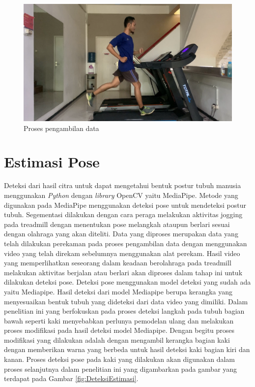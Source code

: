 \begin{figure}[H]
  \centering
  \includegraphics[scale=0.8]{gambar/pengambilan data.png}
  \caption{Proses pengambilan data}
  \label{fig:PengambilanData}
\end{figure}


\section{Estimasi Pose}
\label{sec:DeteksiPose}

Deteksi dari hasil citra untuk dapat mengetahui bentuk postur tubuh manusia menggunakan \emph{Python} dengan \emph{library} OpenCV yaitu MediaPipe. Metode yang digunakan pada MediaPipe menggunakan deteksi pose untuk mendeteksi postur tubuh. Segementasi dilakukan dengan cara peraga melakukan aktivitas jogging pada treadmill dengan menentukan pose melangkah ataupun berlari sesuai dengan olahraga yang akan diteliti. Data yang diproses merupakan data yang telah dilakukan perekaman pada proses pengambilan data dengan menggunakan video yang telah direkam sebelumnya menggunakan alat perekam. Hasil video yang memperlihatkan seseorang dalam keadaan berolahraga pada treadmill melakukan aktivitas berjalan atau berlari akan diproses dalam tahap ini untuk dilakukan deteksi pose. Deteksi pose menggunakan model deteksi yang sudah ada yaitu Mediapipe. Hasil deteksi dari model Mediapipe berupa kerangka yang menyesuaikan bentuk tubuh yang dideteksi dari data video yang dimiliki. Dalam penelitian ini yang berfokuskan pada proses deteksi langkah pada tubuh bagian bawah seperti kaki menyebabkan perlunya pemodelan ulang dan melakukan proses modifikasi pada hasil deteksi model Mediapipe. Dengan begitu proses modifikasi yang dilakukan adalah dengan mengambil kerangka bagian kaki dengan memberikan warna yang berbeda untuk hasil deteksi kaki bagian kiri dan kanan. Proses deteksi pose pada kaki yang dilakukan akan digunakan dalam proses selanjutnya dalam penelitian ini yang digambarkan pada gambar yang terdapat pada Gambar \ref{fig:DeteksiEstimasi}.

